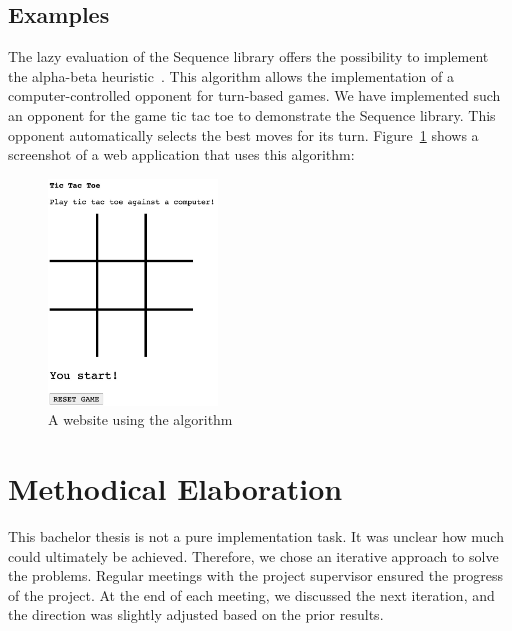 \subsection*{Examples} %
\label{sub:introduction_Examples}
The lazy evaluation of the Sequence library offers the possibility to implement
the alpha-beta heuristic~\cite[Ch. 5]{hughes_why_1989}. 
This algorithm allows the implementation of a computer-controlled opponent for
turn-based games. We have implemented such an opponent for the game tic tac toe
to demonstrate the Sequence library. This opponent automatically selects the
best moves for its turn. Figure~\ref{img:intro_ttt_playfield} shows a screenshot of a web
application that uses this algorithm:
\begin{figure}[H]
    \centering
    \includegraphics[width=0.4\textwidth]{./mainmatter/pictures/tic-tac-toe-field.jpg}
    \caption{A website using the algorithm}
    \label{img:intro_ttt_playfield}
\end{figure}

\section*{Methodical Elaboration} %
\label{sec:intro_methoical_elaboration}
This bachelor thesis is not a pure implementation task. It was unclear how much
could ultimately be achieved. Therefore, we chose an iterative approach to solve
the problems. Regular meetings with the project supervisor ensured the progress
of the project. At the end of each meeting, we discussed the next iteration,
and the direction was slightly adjusted based on the prior results.


